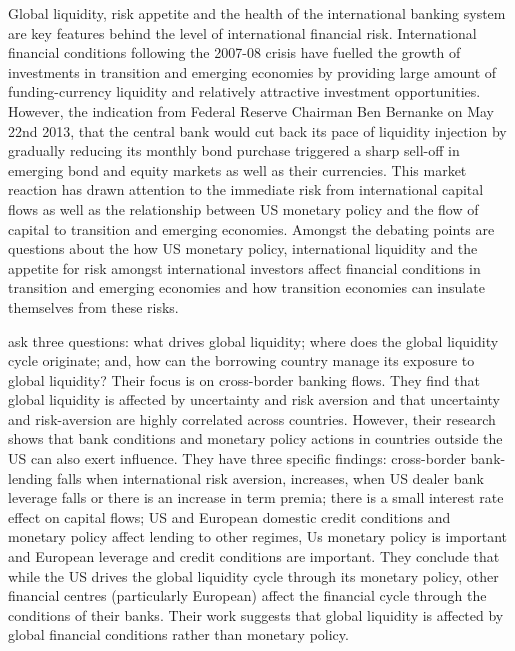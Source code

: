 \documentclass[12pt, a4paper, oneside]{article} %
\begin{document}

Global liquidity, risk appetite and the health of the international banking system are key features behind the level of international financial risk. 
International financial conditions following the 2007-08 crisis have fuelled the growth of investments in transition and emerging economies by providing large amount of funding-currency liquidity and relatively attractive investment opportunities. However, the indication from Federal Reserve Chairman Ben Bernanke on May 22nd 2013, that the central bank would cut back its pace of liquidity injection by gradually reducing its monthly bond purchase triggered a sharp sell-off in emerging bond and equity markets as well as their currencies.  This market reaction has drawn attention to the immediate risk from international capital flows  as well as the relationship between US monetary policy and the flow of capital to transition and emerging economies.  Amongst the debating points are questions about the how  US monetary policy, international liquidity and the appetite for risk amongst international investors affect financial conditions in transition and emerging economies and how transition economies can insulate themselves from these risks. 

\citet{Cerutti2014} ask three questions:  what drives global liquidity; where does the global liquidity cycle originate; and, how can the borrowing country manage its exposure to global liquidity? Their focus is on cross-border banking flows. They find that global liquidity is affected by uncertainty and risk aversion and that uncertainty and risk-aversion are highly correlated across countries. However, their research shows that bank conditions and monetary policy actions in countries outside the US can also exert influence. They have three specific findings:  cross-border bank-lending falls when international risk aversion, increases, when US dealer bank leverage falls or there is an increase in term premia; there is a small interest rate effect on capital flows; US and European domestic credit conditions and monetary policy affect lending to other regimes, Us monetary policy is important and European leverage and credit conditions are important.  They conclude that while the US drives the global liquidity cycle through its monetary policy, other financial centres (particularly European) affect the financial cycle through the conditions of their banks. Their work suggests that global liquidity is affected by global financial conditions rather than monetary policy.
\end{document}
